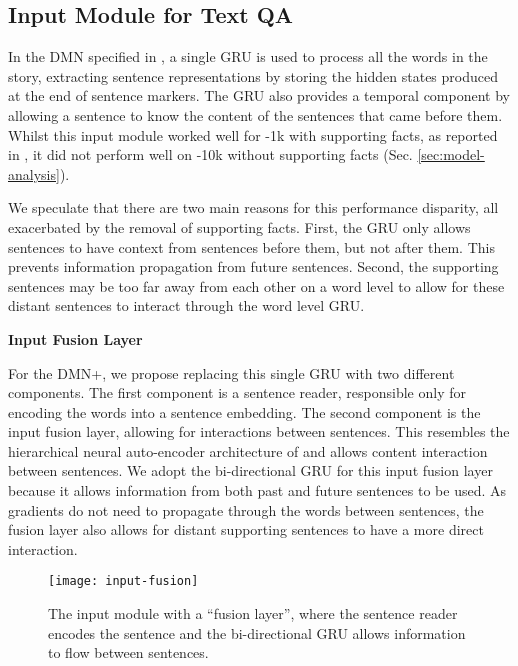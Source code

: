 \documentclass{article}
\begin{document}
\subsection{Input Module for Text QA} \label{inputTQA}
In the DMN specified in \citet{Kumar2015}, a single GRU is used to process all the words in the story, extracting sentence representations by storing the hidden states produced at the end of sentence markers.
The GRU also provides a temporal component by allowing a sentence to know the content of the sentences that came before them.
Whilst this input module worked well for \babi-1k with supporting facts, as reported in \citet{Kumar2015}, it did not perform well on \babi-10k without supporting facts (Sec. \ref{sec:model-analysis}).

We speculate that there are two main reasons for this performance disparity, all exacerbated by the removal of supporting facts.
First, the GRU only allows sentences to have context from sentences before them, but not after them.
This prevents information propagation from future sentences.
Second, the supporting sentences may be too far away from each other on a word level to allow for these distant sentences to interact through the word level GRU.

\textbf{Input Fusion Layer} \label{sec:fusion}

For the DMN+, we propose replacing this single GRU with two different components.
The first component is a sentence reader, responsible only for encoding the words into a sentence embedding.
The second component is the input fusion layer, allowing for interactions between sentences.
This resembles the hierarchical neural auto-encoder architecture of \citet{Li2015} and allows content interaction between sentences.
We adopt the bi-directional GRU for this input fusion layer because it allows information from both past and future sentences to be used.
As gradients do not need to propagate through the words between sentences, the fusion layer also allows for distant supporting sentences to have a more direct interaction.

\begin{figure}
\centering
\texttt{[image: input-fusion]}
\vspace{-0.3cm}
\caption{The input module with a ``fusion layer'', where the sentence reader encodes the sentence and the bi-directional GRU allows information to flow between sentences.}
\vspace{-0.3cm}
\label{fig:fusion}
\end{figure}
\end{document}
